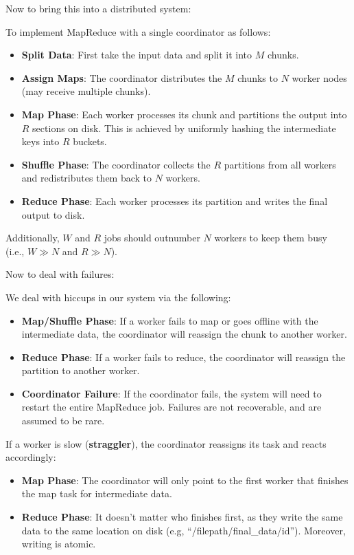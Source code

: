 \noindent
Now to bring this into a distributed system:

\begin{Def}

    To implement MapReduce with a single coordinator as follows:
    \begin{itemize}
        \item \textbf{Split Data}: First take the input data and split it into $M$ chunks.
        \item \textbf{Assign Maps}: The coordinator distributes the $M$ chunks to $N$ worker nodes (may receive multiple chunks).
        \item \textbf{Map Phase}: Each worker processes its chunk and partitions the output into $R$ sections on disk. This is 
        achieved by uniformly hashing the intermediate keys into $R$ buckets.
        \item \textbf{Shuffle Phase}: The coordinator collects the $R$ partitions from all workers and redistributes them back to $N$ workers.
        \item \textbf{Reduce Phase}: Each worker processes its partition and writes the final output to disk.
    \end{itemize}

    \noindent
    Additionally, $W$ and $R$ jobs should outnumber $N$ workers to keep them busy\\
    (i.e., $W \gg N$ and $R \gg N$). 
\end{Def}

\newpage 
\noindent
Now to deal with failures:

\begin{Def}

    We deal with hiccups in our system via the following:
    \begin{itemize}
        \item \textbf{Map/Shuffle Phase}: If a worker fails to map or goes offline with the intermediate data, the coordinator will reassign the chunk to another worker.
        \item \textbf{Reduce Phase}: If a worker fails to reduce, the coordinator will reassign the partition to another worker.
        \item \textbf{Coordinator Failure}: If the coordinator fails, the system will need to restart the entire MapReduce job. Failures are not recoverable, and are assumed to be rare.
    \end{itemize}

    If a worker is slow (\textbf{straggler}), the coordinator reassigns its task and reacts accordingly:
    \begin{itemize}
        \item \textbf{Map Phase}: The coordinator will only point to the first worker that finishes the map task for intermediate data.
        \item \textbf{Reduce Phase}: It doesn't matter who finishes first, as they write the same data to the same location on disk (e.g, ``/filepath/final\_data/id''). Moreover, writing is atomic.
    \end{itemize}
\end{Def}

